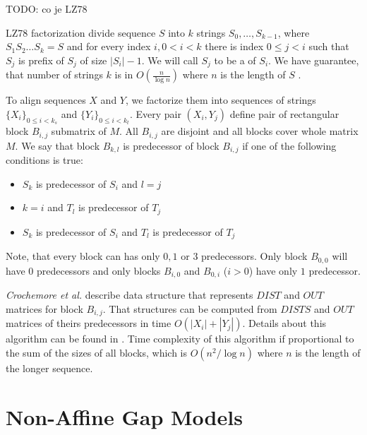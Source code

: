 TODO: co je LZ78

LZ78 factorization divide sequence $S$ into $k$ strings $S_0,\dots,S_{k-1}$, where
$S_1S_2\dots S_k=S$ and for every index  $i,0< i <k$ there is index $0\leq j<i$
such that $S_j$ is prefix of $S_j$ of size $|S_i|-1$. We will call $S_j$ to be a
 of $S_i$. 
We have guarantee, that number of strings $k$ is in  $O(\frac{n}{\log n})$ where
$n$ is the length of $S$ \cite{}. 

To align sequences $X$ and $Y$, we factorize them into sequences of strings
$\{X_i\}_{0\leq i < k_s}$ and $\{Y_i\}_{0\leq i<k_t}$.  Every pair $(X_i,Y_j)$
define pair of rectangular block $B_{i,j}$ submatrix of $M$.  All $B_{i,j}$ are
disjoint and all blocks cover whole matrix $M$. We say that block $B_{k,l}$ is
predecessor of block $B_{i,j}$ if one of the following conditions is true:


\begin{itemize}
\item $S_k$ is predecessor of $S_i$ and $l=j$
\item $k=i$ and $T_l$ is predecessor of $T_j$
\item $S_k$ is predecessor of $S_i$ and $T_l$ is predecessor of $T_j$
\end{itemize}

Note, that every block can has only $0,1$ or $3$ predecessors. Only block
$B_{0,0}$ will have $0$ predecessors and only blocks $B_{i,0}$ and $B_{0,i}$
($i>0$) have only $1$ predecessor.  

{\it Crochemore et al.} describe data structure that represents $DIST$ and $OUT$
matrices for block \nocite{Crochemore2002} $B_{i,j}$. That structures can be
computed from $DISTS$ and $OUT$ matrices of theirs predecessors in time
$O(|X_i|+|Y_j|)$. Details about this algorithm can be found in
\cite{Crochemore2002}. Time complexity of this algorithm if proportional to the
sum of the sizes of all blocks, which is $O(n^2/\log n)$ where $n$ is the length
of the longer sequence.



\section{Non-Affine Gap Models} 

